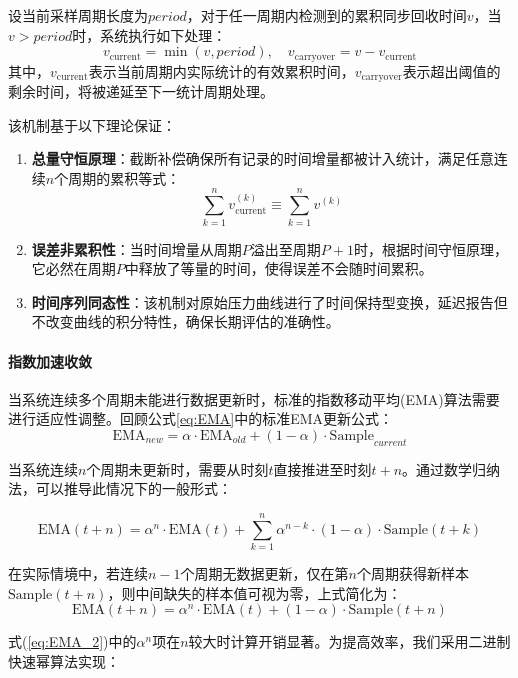 设当前采样周期长度为\(\textit{period}\)，对于任一周期内检测到的累积同步回收时间\(v\)，当\(v > \textit{period}\)时，系统执行如下处理：
\[
v_{\text{current}} = \min(v, \textit{period}), \quad v_{\text{carryover}} = v - v_{\text{current}}
\]
其中，\(v_{\text{current}}\)表示当前周期内实际统计的有效累积时间，\(v_{\text{carryover}}\)表示超出阈值的剩余时间，将被递延至下一统计周期处理。

该机制基于以下理论保证：
\begin{enumerate}
    \item \textbf{总量守恒原理}：截断补偿确保所有记录的时间增量都被计入统计，满足任意连续\(n\)个周期的累积等式：
    \[
    \sum_{k=1}^n v_{\text{current}}^{(k)} \equiv \sum_{k=1}^n v^{(k)}
    \]
    \item \textbf{误差非累积性}：当时间增量从周期\(P\)溢出至周期\(P+1\)时，根据时间守恒原理，它必然在周期\(P\)中释放了等量的时间，使得误差不会随时间累积。
    \item \textbf{时间序列同态性}：该机制对原始压力曲线进行了时间保持型变换，延迟报告但不改变曲线的积分特性，确保长期评估的准确性。
\end{enumerate}

\paragraph{指数加速收敛} \quad 当系统连续多个周期未能进行数据更新时，标准的指数移动平均(EMA)算法需要进行适应性调整。回顾公式\ref{eq:EMA}中的标准EMA更新公式：
\begin{equation}
    \text{EMA}_{new} = \alpha \cdot \text{EMA}_{old} + (1-\alpha) \cdot \text{Sample}_{current}
\end{equation}

当系统连续\(n\)个周期未更新时，需要从时刻\(t\)直接推进至时刻\(t+n\)。通过数学归纳法，可以推导此情况下的一般形式：

\begin{equation}
\text{EMA}(t+n) = \alpha^n \cdot \text{EMA}(t) + \sum_{k=1}^{n} \alpha^{n-k} \cdot (1-\alpha) \cdot \text{Sample}(t+k)
\end{equation}

在实际情境中，若连续\(n-1\)个周期无数据更新，仅在第\(n\)个周期获得新样本\(\text{Sample}(t+n)\)，则中间缺失的样本值可视为零，上式简化为：
\begin{equation}
\label{eq:EMA_2}
\text{EMA}(t+n) = \alpha^n \cdot \text{EMA}(t) + (1-\alpha) \cdot \text{Sample}(t+n)
\end{equation}

式(\ref{eq:EMA_2})中的\(\alpha^n\)项在\(n\)较大时计算开销显著。为提高效率，我们采用二进制快速幂算法实现：

